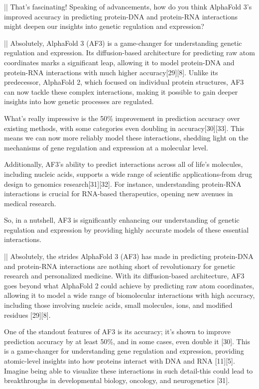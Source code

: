 \documentclass[11pt]{article}
\begin{document}
\begin{showcase}[title=Topic: AlphaFold 3]
|\moderatorbg{\moderator:}|
That's fascinating! Speaking of advancements, how do you think AlphaFold 3's improved accuracy in predicting protein-DNA and protein-RNA interactions might deepen our insights into genetic regulation and expression?

||
Absolutely, AlphaFold 3 (AF3) is a game-changer for understanding genetic regulation and expression. Its diffusion-based architecture for predicting raw atom coordinates marks a significant leap, allowing it to model protein-DNA and protein-RNA interactions with much higher accuracy[29][8]. Unlike its predecessor, AlphaFold 2, which focused on individual protein structures, AF3 can now tackle these complex interactions, making it possible to gain deeper insights into how genetic processes are regulated.

What's really impressive is the 50\% improvement in prediction accuracy over existing methods, with some categories even doubling in accuracy[30][33]. This means we can now more reliably model these interactions, shedding light on the mechanisms of gene regulation and expression at a molecular level.

Additionally, AF3's ability to predict interactions across all of life's molecules, including nucleic acids, supports a wide range of scientific applications-from drug design to genomics research[31][32]. For instance, understanding protein-RNA interactions is crucial for RNA-based therapeutics, opening new avenues in medical research. 

So, in a nutshell, AF3 is significantly enhancing our understanding of genetic regulation and expression by providing highly accurate models of these essential interactions.

||
Absolutely, the strides AlphaFold 3 (AF3) has made in predicting protein-DNA and protein-RNA interactions are nothing short of revolutionary for genetic research and personalized medicine. With its diffusion-based architecture, AF3 goes beyond what AlphaFold 2 could achieve by predicting raw atom coordinates, allowing it to model a wide range of biomolecular interactions with high accuracy, including those involving nucleic acids, small molecules, ions, and modified residues [29][8].

One of the standout features of AF3 is its accuracy; it's shown to improve prediction accuracy by at least 50\%, and in some cases, even double it [30]. This is a game-changer for understanding gene regulation and expression, providing atomic-level insights into how proteins interact with DNA and RNA [11][5]. Imagine being able to visualize these interactions in such detail-this could lead to breakthroughs in developmental biology, oncology, and neurogenetics [31].


\end{showcase}
\end{document}
